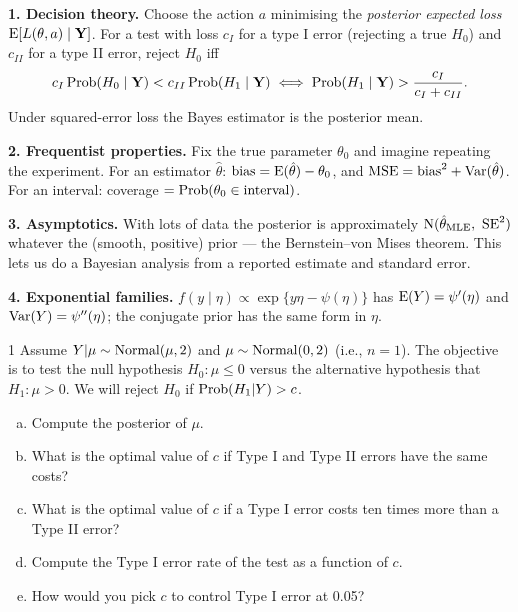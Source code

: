 \documentclass[11pt]{article}
\begin{document}
\begin{recall}
\textbf{1. Decision theory.} Choose the action $a$ minimising the \emph{posterior expected loss} $\mathrm{E}[L(\theta,a)\mid\mathbf Y]$. For a test with loss $c_{I}$ for a type I error (rejecting a true $H_0$) and $c_{II}$ for a type II error, reject $H_0$ iff
\[
c_{I}\,\mathrm{Prob}(H_0\mid\mathbf Y)<c_{II}\,\mathrm{Prob}(H_1\mid\mathbf Y)\iff\mathrm{Prob}(H_1\mid\mathbf Y)>\frac{c_I}{c_I+c_{II}}.
\]
Under squared-error loss the Bayes estimator is the posterior mean.

\medskip
\textbf{2. Frequentist properties.} Fix the true parameter $\theta_0$ and imagine repeating the experiment. For an estimator $\hat\theta$: $\text{bias}=\mathrm{E}(\hat\theta)-\theta_0$, and $\text{MSE}=\text{bias}^2+\mathrm{Var}(\hat\theta)$. For an interval: coverage $=\mathrm{Prob}(\theta_0\in\text{interval})$.

\medskip
\textbf{3. Asymptotics.} With lots of data the posterior is approximately $\mathrm{N}(\hat\theta_{\text{MLE}},\ \text{SE}^2)$ whatever the (smooth, positive) prior --- the Bernstein--von Mises theorem. This lets us do a Bayesian analysis from a reported estimate and standard error.

\medskip
\textbf{4. Exponential families.} $f(y\mid\eta)\propto\exp\{y\eta-\psi(\eta)\}$ has $\mathrm{E}(Y)=\psi'(\eta)$ and $\mathrm{Var}(Y)=\psi''(\eta)$; the conjugate prior has the same form in $\eta$.
\end{recall}

\clearpage


\begin{problem}{1}
Assume $Y|\mu\sim\mathrm{Normal}(\mu,2)$ and $\mu\sim\mathrm{Normal}(0,2)$ (i.e., $n=1$). The objective is to test the null hypothesis $H_0:\mu\le0$ versus the alternative hypothesis that $H_1:\mu>0$. We will reject $H_0$ if $\mathrm{Prob}(H_1|Y)>c$.
\begin{enumerate}[(a)]
\item Compute the posterior of $\mu$.
\item What is the optimal value of $c$ if Type I and Type II errors have the same costs?
\item What is the optimal value of $c$ if a Type I error costs ten times more than a Type II error?
\item Compute the Type I error rate of the test as a function of $c$.
\item How would you pick $c$ to control Type I error at 0.05?
\end{enumerate}
\end{problem}
\end{document}
